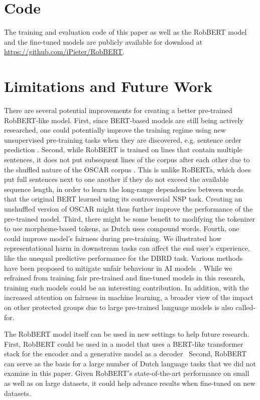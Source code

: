 \documentclass[11pt,a4paper]{article}
\begin{document}
\section{Code}

The training and evaluation code of this paper as well as the RobBERT model and the fine-tuned models are publicly available for download at \url{https://github.com/iPieter/RobBERT}.

\section{Limitations and Future Work}


There are several potential improvements for creating a better pre-trained RobBERT-like model.
First, since BERT-based models are still 
being actively researched, one could potentially improve the training regime using new unsupervised pre-training tasks when they are discovered, e.g. sentence order prediction \citep{lan2019albert}.
Second, while RobBERT is trained on lines that contain multiple sentences, it does not put subsequent lines of the corpus after each other due to the shuffled nature of the OSCAR corpus \citep{ortizsuarezAsynchronous2019}.
This is unlike RoBERTa, which does put full sentences next to 
one another
if they do not exceed the available sequence length, in order to learn the long-range dependencies between words that the original BERT learned using its controversial NSP task.
Creating an unshuffled version of OSCAR might thus further improve the performance of the pre-trained model.
Third, there might be some benefit to modifying the tokenizer to use morpheme-based tokens, as Dutch uses compound words.
Fourth, one could improve model's fairness during pre-training.
We illustrated how representational harm in downstream tasks can affect the end user's experience, like the unequal predictive performance for the DBRD task.
Various methods have been proposed to mitigate unfair behaviour in AI models~\citep{zemel2013learning, delobelleEthical2020}.
While we refrained from training fair pre-trained and fine-tuned models in this research, training such models could be an interesting contribution.
In addition, with the increased attention on fairness in machine learning, a broader view of the impact on other protected groups due to large pre-trained language models is also called-for.

The RobBERT model itself can be used in new settings to help future research.
First, RobBERT could be used in a model that uses a BERT-like transformer stack for the encoder and a generative model as a decoder~\citep{raffelExploring2019,lewis2019bart}
Second, RobBERT can serve as the basis for a large number of Dutch language tasks that we did not examine in this paper.
Given RobBERT's state-of-the-art performance on small as well as on large datasets,
it could help advance results
when fine-tuned on new datasets. 
\end{document}
